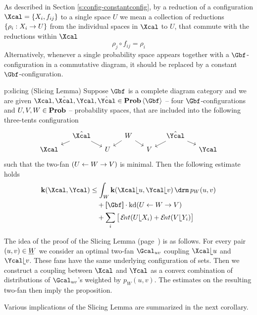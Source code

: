   As described in Section \ref{s:config-constantconfig}, by a reduction
  of a configuration $\Xcal=\set{X_{i},f_{ij}}$ to a single space $U$ we
  mean a collection of reductions $\left\{\rho_{i}:X_{i}\stackrel{}{\rightarrow} U\right\}$ from the
  individual spaces in $\Xcal$ to $U$, that commute with the reductions
  within $\Xcal$
  \[
  \rho_{j}\circ f_{ij}=\rho_{i}
  \]
  Alternatively, whenever a single probability space appears together
  with a $\Gbf$-configuration in a commutative diagram, it should be
  replaced by a constant $\Gbf$-configuration.
  \begin{proposition}{p:slicing}
    {\rm (Slicing Lemma)} Suppose $\Gbf$ is a complete diagram
    category and we are given
    $\Xcal,\hat\Xcal,\Ycal,\hat\Ycal\in\prob\<\Gbf>$ -- four
    $\Gbf$-configurations and $U,V,W\in\operatorname{\mathbf{Prob}}$ -- probability spaces,
    that are included into the following three-tents configuration
    \[
    \begin{tikzcd}[column sep=small,row sep=tiny,ampersand replacement=\&]
      \mbox{}
      \&
      \hat\Xcal
      \arrow{dl}{}
      \arrow{dr}{}
      \&
      \&
      W
      \arrow{dl}{}
      \arrow{dr}{}
      \&
      \&
      \hat\Ycal
      \arrow{dl}{}
      \arrow{dr}{}
      \&
      \mbox{}
      \\
      \Xcal
      \&
      \&
      U
      \&
      \&
      V
      \&
      \&
      \Ycal
    \end{tikzcd}
    \]
    such that the two-fan $(U\stackrel{}{\leftarrow} W\stackrel{}{\rightarrow} V)$ is minimal.
    Then the following estimate holds
    \begin{align*}
      \ikd(\Xcal,\Ycal) 
      &\leq 
      \int_{W}\ikd(\Xcal\rel u,\Ycal\rel v)\d p_{W}(u,v)\\
      &\quad+
      \size{\Gbf}\cdot\kd(U\ot W\to V)\\
      &\quad+
      \sum_{i}\big[\ent(U\rel X_{i})+\ent(V\rel Y_{i})\big]
    \end{align*}
  \end{proposition}
  The idea of the proof of the Slicing Lemma (page~\pageref{p:slicing.rep})
  is as follows. For every pair $(u,v)\in\un W$ we consider an optimal
  two-fan $\Gcal_{uv}$ coupling $\Xcal\rel u$ and $\Ycal\rel v$.
  These fans have the same underlying configuration of sets.
  Then we construct a coupling between $\Xcal$ and $\Ycal$ as a convex combination of distributions of
  $\Gcal_{uv}$'s weighted by $p_{W}(u,v)$. The estimates on the
  resulting two-fan then imply the proposition.

  Various implications of the Slicing Lemma are summarized in the next
  corollary.
  
